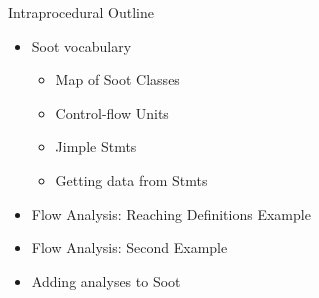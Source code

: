 \begin{slide}{Intraprocedural Outline}
\begin{itemize}
\item Soot vocabulary
\begin{itemize}
\item Map of Soot Classes
\item Control-flow Units
\item Jimple Stmts
\item Getting data from Stmts
\end{itemize}
\item Flow Analysis: Reaching Definitions Example
\item Flow Analysis: Second Example
\item Adding analyses to Soot
\end{itemize}
\end{slide}




